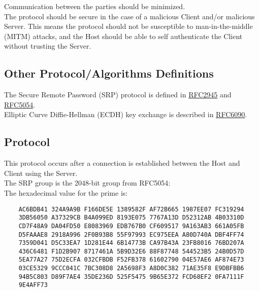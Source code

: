 \documentclass{article}
\begin{document}
    Communication between the parties should be minimized.\\

    The protocol should be secure in the case of a malicious Client and/or malicious
    Server. This means the protocol should not be susceptible to man-in-the-middle
    (MITM) attacks, and the Host should be able to self authenticate the Client
    without trusting the Server.\\

    \subsection{Other Protocol/Algorithms Definitions}

    The Secure Remote Password (SRP) protocol is defined in
    \href{(https://datatracker.ietf.org/doc/html/rfc2945}{RFC2945} and
    \href{https://datatracker.ietf.org/doc/html/rfc5054}{RFC5054}.\\

    Elliptic Curve Diffie-Hellman (ECDH) key exchange is described in
    \href{https://datatracker.ietf.org/doc/html/rfc60904}{RFC6090}.\\

    \subsection{Protocol}

    This protocol occurs after a connection is established between the Host and
    Client using the Server.\\

    The SRP group is the 2048-bit group from RFC5054:\\

    The hexadecimal value for the prime is:\\

    \begin{verbatim}
    AC6BDB41 324A9A9B F166DE5E 1389582F AF72B665 1987EE07 FC319294
    3DB56050 A37329CB B4A099ED 8193E075 7767A13D D52312AB 4B03310D
    CD7F48A9 DA04FD50 E8083969 EDB767B0 CF609517 9A163AB3 661A05FB
    D5FAAAE8 2918A996 2F0B93B8 55F97993 EC975EEA A80D740A DBF4FF74
    7359D041 D5C33EA7 1D281E44 6B14773B CA97B43A 23FB8016 76BD207A
    436C6481 F1D2B907 8717461A 5B9D32E6 88F87748 544523B5 24B0D57D
    5EA77A27 75D2ECFA 032CFBDB F52FB378 61602790 04E57AE6 AF874E73
    03CE5329 9CCC041C 7BC308D8 2A5698F3 A8D0C382 71AE35F8 E9DBFBB6
    94B5C803 D89F7AE4 35DE236D 525F5475 9B65E372 FCD68EF2 0FA7111F
    9E4AFF73
    \end{verbatim}
\end{document}
